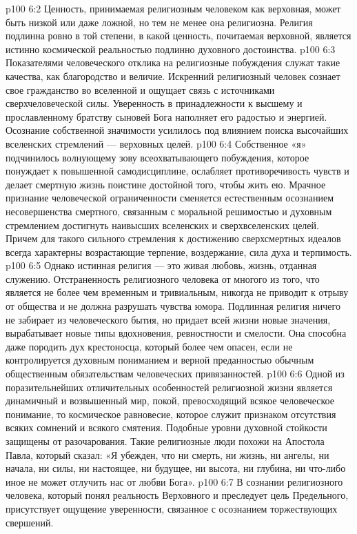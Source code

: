 \vs p100 6:2 Ценность, принимаемая религиозным человеком как верховная, может быть низкой или даже ложной, но тем не менее она религиозна. Религия подлинна ровно в той степени, в какой ценность, почитаемая верховной, является истинно космической реальностью подлинно духовного достоинства.
\vs p100 6:3 Показателями человеческого отклика на религиозные побуждения служат такие качества, как благородство и величие. Искренний религиозный человек сознает свое гражданство во вселенной и ощущает связь с источниками сверхчеловеческой силы. Уверенность в принадлежности к высшему и прославленному братству сыновей Бога наполняет его радостью и энергией. Осознание собственной значимости усилилось под влиянием поиска высочайших вселенских стремлений --- верховных целей.
\vs p100 6:4 Собственное «я» подчинилось волнующему зову всеохватывающего побуждения, которое понуждает к повышенной самодисциплине, ослабляет противоречивость чувств и делает смертную жизнь поистине достойной того, чтобы жить ею. Мрачное признание человеческой ограниченности сменяется естественным осознанием несовершенства смертного, связанным с моральной решимостью и духовным стремлением достигнуть наивысших вселенских и сверхвселенских целей. Причем для такого сильного стремления к достижению сверхсмертных идеалов всегда характерны возрастающие терпение, воздержание, сила духа и терпимость.
\vs p100 6:5 Однако истинная религия --- это живая любовь, жизнь, отданная служению. Отстраненность религиозного человека от многого из того, что является не более чем временным и тривиальным, никогда не приводит к отрыву от общества и не должна разрушать чувства юмора. Подлинная религия ничего не забирает из человеческого бытия, но придает всей жизни новые значения, вырабатывает новые типы вдохновения, ревностности и смелости. Она способна даже породить дух крестоносца, который более чем опасен, если не контролируется духовным пониманием и верной преданностью обычным общественным обязательствам человеческих привязанностей.
\vs p100 6:6 \pc Одной из поразительнейших отличительных особенностей религиозной жизни является динамичный и возвышенный мир, покой, превосходящий всякое человеческое понимание, то космическое равновесие, которое служит признаком отсутствия всяких сомнений и всякого смятения. Подобные уровни духовной стойкости защищены от разочарования. Такие религиозные люди похожи на Апостола Павла, который сказал: «Я убежден, что ни смерть, ни жизнь, ни ангелы, ни начала, ни силы, ни настоящее, ни будущее, ни высота, ни глубина, ни что\hyp{}либо иное не может отлучить нас от любви Бога».
\vs p100 6:7 В сознании религиозного человека, который понял реальность Верховного и преследует цель Предельного, присутствует ощущение уверенности, связанное с осознанием торжествующих свершений.
